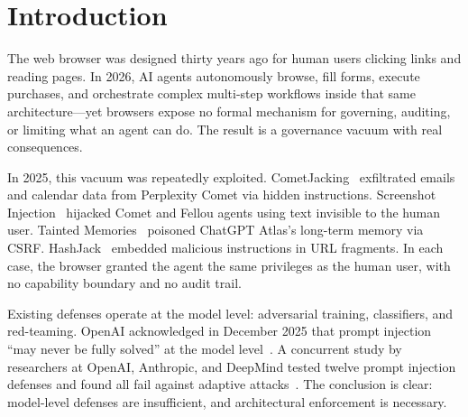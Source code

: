 
\section{Introduction}
\label{sec:introduction}


The web browser was designed thirty years ago for human users
clicking links and reading pages.
In 2026, AI agents autonomously browse, fill forms, execute purchases,
and orchestrate complex multi-step workflows inside that same
architecture---yet browsers expose no formal mechanism for governing,
auditing, or limiting what an agent can do.
The result is a governance vacuum with real consequences.


In 2025, this vacuum was repeatedly exploited.
CometJacking~\cite{layerx_cometjacking_2025} exfiltrated emails and
calendar data from Perplexity Comet via hidden instructions.
Screenshot Injection~\cite{brave_screenshot_injection_2025} hijacked
Comet and Fellou agents using text invisible to the human user.
Tainted Memories~\cite{layerx_tainted_memories_2025} poisoned
ChatGPT Atlas's long-term memory via CSRF.
HashJack~\cite{cato_hashjack_2025} embedded malicious instructions
in URL fragments.
In each case, the browser granted the agent the same privileges as
the human user, with no capability boundary and no audit trail.


Existing defenses operate at the model level: adversarial training,
classifiers, and red-teaming.
OpenAI acknowledged in December 2025 that prompt injection
``may never be fully solved'' at the model
level~\cite{openai_prompt_injection_2025}.
A concurrent study by researchers at OpenAI, Anthropic, and
DeepMind tested twelve prompt injection defenses and found all
fail against adaptive attacks~\cite{nasr2025}.
The conclusion is clear: model-level defenses are insufficient,
and architectural enforcement is necessary.

